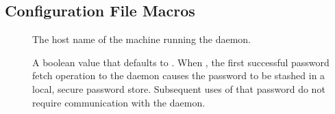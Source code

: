 




\subsection{\label{sec:Credd-Config-File-Entries}
Configuration File Macros}
 
\begin{description}

\item[]\label{param:CreddHost}
The host name of the machine running the  daemon.

\item[]\label{param:CreddCacheLocally}
A boolean value that defaults to .
When , the first successful password fetch operation to the
 daemon causes the password to be stashed in a local, 
secure password store.
Subsequent uses of that password do not require
communication with the  daemon.

\end{description}


